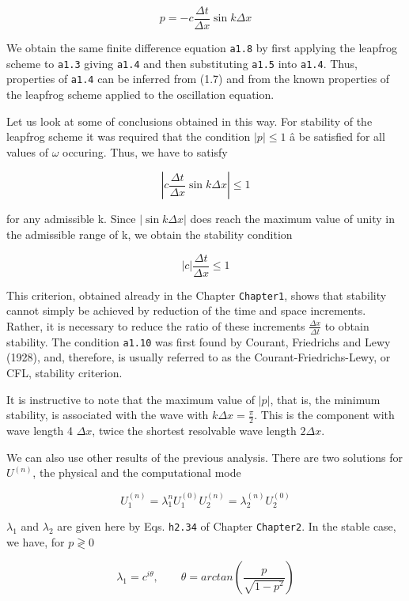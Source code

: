  {\[p = - c\frac{\Delta t}{\Delta x}\sin{k\Delta x}\]}

We obtain the same finite difference equation \texttt{a1.8} by first
applying the leapfrog scheme to \texttt{a1.3} giving \texttt{a1.4} and
then substituting \texttt{a1.5} into \texttt{a1.4}. Thus, properties of
\texttt{a1.4} can be inferred from (1.7) and from the known properties
of the leapfrog scheme applied to the oscillation equation.

Let us look at some of conclusions obtained in this way. For stability
of the leapfrog scheme it was required that the condition
\( \left| p \right| \leq 1 \) â be satisfied for all values of \(\omega\)
occuring. Thus, we have to satisfy

\[\left| c\frac{\Delta t}{\Delta x}\sin{k\Delta x } \right| \leq 1\]

for any admissible k. Since \(\left| \sin{k\Delta x} \right|\) does
reach the maximum value of unity in the admissible range of k, we obtain
the stability condition

 {\[\left| c \right|\frac{\Delta t}{\Delta x} \leq 1\]}

This criterion, obtained already in the Chapter \texttt{Chapter1}, shows
that stability cannot simply be achieved by reduction of the time and
space increments. Rather, it is necessary to reduce the ratio of these
increments \(\frac{\Delta x}{\Delta t }\) to obtain stability. The
condition \texttt{a1.10} was first found by Courant, Friedrichs and Lewy
(1928), and, therefore, is usually referred to as the
Courant-Friedrichs-Lewy, or CFL, stability criterion.

It is instructive to note that the maximum value of
\(\left| p \right|\), that is, the minimum stability, is associated with
the wave with \(k\Delta x = \frac{\pi}{2}\). This is the component with
wave length 4 \(\Delta x\), twice the shortest resolvable wave length
\(2\Delta x\).

We can also use other results of the previous analysis. There are two
solutions for \(U^{\left( n \right)}\), the physical and the
computational mode

 {\[U_{1}^{\left( n \right)} = \lambda_{1}^{n}U_{1}^{\left( 0 \right)}U_{2}^{\left( n \right)}
= \lambda_{2}^{\left( n \right)}U_{2}^{\left( 0 \right)}\]}

\(\lambda_{1}\) and \(\lambda_{2 }\) are given here by Eqs.
\texttt{h2.34} of Chapter \texttt{Chapter2}. In the stable case, we
have, for \(p \gtrless 0\)

 {\[\lambda_{1} = c^{i\theta}, \qquad \theta = arctan\left( \frac{p}{\sqrt{1 - p^{2}}} \right)\]}

